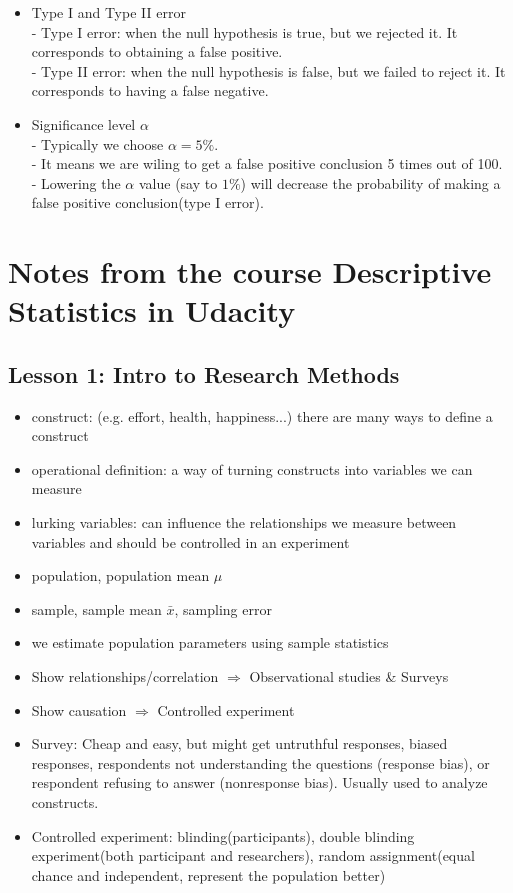 \documentclass[twoside,12pt]{article}
\begin{document}
\begin{itemize}
\item Type I and Type II error\\
- Type I error: when the null hypothesis is true, but we rejected it. It corresponds to obtaining a false positive. \\
- Type II error: when the null hypothesis is false, but we failed to reject it. It corresponds to having a false negative. \\
\item Significance level $\alpha$\\ 
- Typically we choose $\alpha = 5\%$.\\
- It means we are wiling to get a false positive conclusion 5 times out of 100. \\
- Lowering the $\alpha$ value (say to $1\%$) will decrease the probability of making a false positive conclusion(type I error).
\end{itemize}

\section{Notes from the course Descriptive Statistics in Udacity}

 \subsection{Lesson 1: Intro to Research Methods}
\begin{itemize}
\item construct: (e.g. effort, health, happiness...) there are many ways to define a construct 
\item operational definition: a way of turning constructs into variables we can measure
\item lurking variables: can influence the relationships we measure between variables and should be controlled in an experiment 
\item population, population mean $\mu$
\item sample, sample mean $\bar{x}$, sampling error
\item we estimate population parameters using sample statistics 
\item Show relationships/correlation $\Rightarrow$ Observational studies \& Surveys
\item Show causation $\Rightarrow$ Controlled experiment
\item Survey: Cheap and easy, but might get untruthful responses, biased responses, respondents not understanding the questions (response bias), or respondent refusing to answer (nonresponse bias). Usually used to analyze constructs. 
\item Controlled experiment: blinding(participants), double blinding experiment(both participant and researchers), random assignment(equal chance and independent, represent the population better)
\end{itemize}
\end{document}
